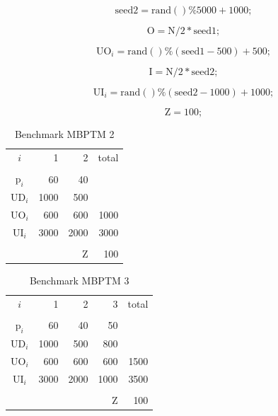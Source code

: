\documentclass[10pt,fleqn,a4paper,twoside]{article}
\begin{document}
\begin{equation}
\textrm{seed2} = \textrm{rand}()\%5000 + 1000;
\end{equation}

\begin{equation}
\textrm{O} = \textrm{N}/2*\textrm{seed1};
\end{equation}

\begin{equation}
\textrm{UO}_i = \textrm{rand}()\%(\textrm{seed1}-500) + 500;
\end{equation}

\begin{equation}
\textrm{I} = \textrm{N}/2*\textrm{seed2};
\end{equation}

\begin{equation}
\textrm{UI}_i = \textrm{rand}()\%(\textrm{seed2}-1000) + 1000;
\end{equation}

\begin{equation}
\textrm{Z} = 100;
\end{equation}


\begin{table}[h]
\begin{center}
\begin{tabular}[c]{c r r r}
$i$ & 1 & 2 & total \\
\cline {1-4} \\
$\textrm{p}_i$ & 60 & 40 & \\
$\textrm{UD}_i$ & 1000 & 500 & \\
$\textrm{UO}_i$ & 600 & 600 & 1000 \\
$\textrm{UI}_i$ & 3000 & 2000 & 3000 \\
\cline {1-4} \\
& & $\textrm{Z}$ & 100 \\
\end{tabular}
\caption{Benchmark MBPTM 2}
\label{tab:MBPTMP001}
\end{center}
\end{table}

\begin{table}[h]
\begin{center}
\begin{tabular}[c]{c r r r r}
$i$ & 1 & 2 & 3 & total \\
\cline {1-5} \\
$\textrm{p}_i$ & 60 & 40 & 50 \\
$\textrm{UD}_i$ & 1000 & 500 & 800 \\
$\textrm{UO}_i$ & 600 & 600 & 600 & 1500 \\
$\textrm{UI}_i$ & 3000 & 2000 & 1000 & 3500 \\
\cline {1-5} \\
& & & $\textrm{Z}$ & 100 \\
\end{tabular}
\caption{Benchmark MBPTM 3}
\label{tab:MBPTMP002}
\end{center}
\end{table}
\end{document}
